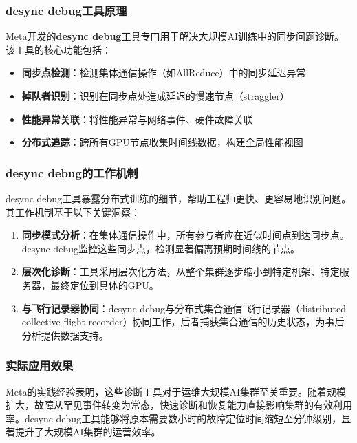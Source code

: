 \subsubsection{desync debug工具原理}

Meta开发的\textbf{desync debug}工具专门用于解决大规模AI训练中的同步问题诊断。该工具的核心功能包括：

\begin{itemize}
    \item \textbf{同步点检测}：检测集体通信操作（如AllReduce）中的同步延迟异常
    \item \textbf{掉队者识别}：识别在同步点处造成延迟的慢速节点（straggler）
    \item \textbf{性能异常关联}：将性能异常与网络事件、硬件故障关联
    \item \textbf{分布式追踪}：跨所有GPU节点收集时间线数据，构建全局性能视图
\end{itemize}

\subsubsection{desync debug的工作机制}

desync debug工具暴露分布式训练的细节，帮助工程师更快、更容易地识别问题。其工作机制基于以下关键洞察：

\begin{enumerate}
    \item \textbf{同步模式分析}：在集体通信操作中，所有参与者应在近似时间点到达同步点。desync debug监控这些同步点，检测显著偏离预期时间线的节点。

    \item \textbf{层次化诊断}：工具采用层次化方法，从整个集群逐步缩小到特定机架、特定服务器，最终定位到具体的GPU。

    \item \textbf{与飞行记录器协同}：desync debug与分布式集合通信飞行记录器（distributed collective flight recorder）协同工作，后者捕获集合通信的历史状态，为事后分析提供数据支持。
\end{enumerate}

\subsubsection{实际应用效果}

Meta的实践经验表明，这些诊断工具对于运维大规模AI集群至关重要。随着规模扩大，故障从罕见事件转变为常态，快速诊断和恢复能力直接影响集群的有效利用率。desync debug工具能够将原本需要数小时的故障定位时间缩短至分钟级别，显著提升了大规模AI集群的运营效率。

